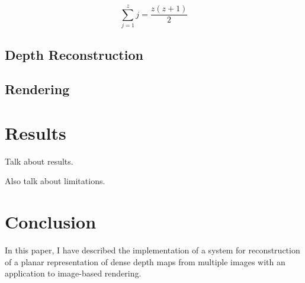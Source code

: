 \documentclass[conference]{acmsiggraph}
\begin{document}
\begin{equation}
    \label{eq:sfm}
    \sum_{j=1}^{z} j = \frac{z(z+1)}{2}
\end{equation}

\subsection{Depth Reconstruction}

\subsection{Rendering}



\section{Results}

Talk about results.

Also talk about limitations.

\section{Conclusion}

In this paper, I have described the implementation of a system for
reconstruction of a planar representation of dense depth maps from multiple images
with an application to image-based rendering.




\end{document}
